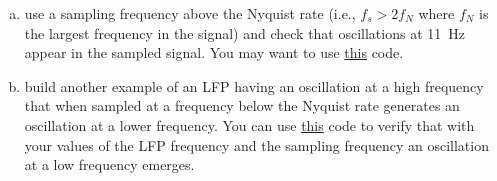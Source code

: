 \documentclass[12pt]{article}
\begin{document}
\begin{enumerate}
\begin{enumerate}[(a)]
            \item use a sampling frequency above the Nyquist rate (i.e.,
                $f_s>2f_N$ where $f_N$ is the largest frequency in the signal)
                and check that oscillations at 11~Hz appear in the sampled
                signal. You may want to use
                \href{https://github.com/joacorapela/neuroinformatics24/blob/master/worksheets/02_LFPs_spectralAnalysis/code/doExUndersampledLFP.py}{this}
                code.

            \item build another example of an LFP having an oscillation at a
                high frequency that when sampled at a frequency below the
                Nyquist rate generates an oscillation at a lower frequency. You
                can use
                \href{https://github.com/joacorapela/neuroinformatics24/blob/master/worksheets/02_LFPs_spectralAnalysis/code/doExUndersampledLFP.py}{this} code to verify that with your values of
                the LFP frequency and the sampling frequency an oscillation
                at a low frequency emerges.

    \end{enumerate}
\end{enumerate}
\end{document}
